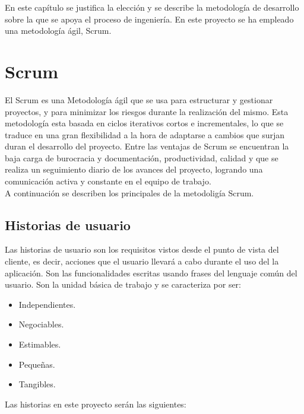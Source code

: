En este capítulo se justifica la elección y se describe la metodología de desarrollo sobre la que se apoya el proceso de ingeniería. En este proyecto se ha empleado una metodología ágil, Scrum. 



\section{Scrum}

El Scrum es una  Metodología ágil \cite{6} \cite{9} que se usa para estructurar y gestionar proyectos, y para minimizar los riesgos durante la realización del mismo.
Esta metodología esta basada en ciclos iterativos cortos e incrementales, lo que se traduce en una gran flexibilidad a la hora de adaptarse a cambios que surjan duran el desarrollo del proyecto.
Entre las ventajas de Scrum se encuentran la baja carga de burocracia y documentación, productividad, calidad y que se realiza un seguimiento diario de los avances del proyecto, logrando una comunicación activa y constante en el equipo de trabajo.\\
A continuación se describen los principales  de la metodoligía Scrum.


\subsection{Historias de usuario}
Las historias de usuario son los requisitos vistos desde el punto de vista del cliente, es decir, acciones que el usuario llevará a cabo durante el uso del la aplicación. Son las funcionalidades escritas usando frases del lenguaje común del usuario. Son la unidad básica de trabajo y se caracteriza por ser:
\begin{itemize}
\item Independientes.
 \item Negociables.
  \item Estimables.
  \item Pequeñas.
   \item Tangibles.
    
\end{itemize}

Las historias en este proyecto serán las siguientes:


